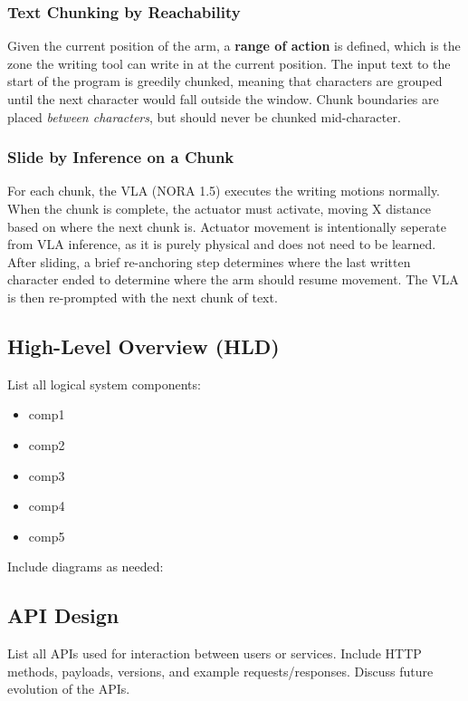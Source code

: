 \documentclass[12pt,a4paper]{article}
\begin{document}
\subsubsection*{Text Chunking by Reachability}

Given the current position of the arm, a \textbf{range of action} is defined, which is the zone the writing tool can write in at the current position. The input text to the start of the program is greedily chunked, meaning that characters are grouped until the next character would fall outside the window. Chunk boundaries are placed \emph{between characters}, but should never be chunked mid-character.

\subsubsection*{Slide by Inference on a Chunk}

For each chunk, the VLA (NORA 1.5) executes the writing motions normally. When the chunk is complete, the actuator must activate, moving X distance based on where the next chunk is. Actuator movement is intentionally seperate from VLA inference, as it is purely physical and does not need to be learned. After sliding, a brief re-anchoring step determines where the last written character ended to determine where the arm should resume movement. The VLA is then re-prompted with the next chunk of text.

\subsection{High-Level Overview (HLD)}
List all logical system components:
\begin{itemize}
  \item comp1
  \item comp2
  \item comp3
  \item comp4
  \item comp5
\end{itemize}

Include diagrams as needed:
\begin{center}
\end{center}

\subsection{API Design}
List all APIs used for interaction between users or services.  
Include HTTP methods, payloads, versions, and example requests/responses.  
Discuss future evolution of the APIs.
\end{document}
